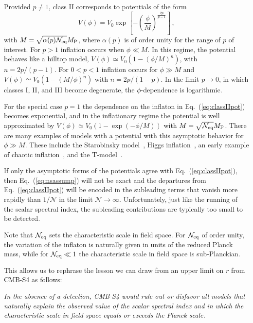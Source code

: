 Provided $p\neq 1$, class II corresponds to potentials of the form 
\begin{equation}\label{eq:classIIpot}
V(\phi)=V_0\exp\left[-\left(\frac{\phi}{M}\right)^{\frac{2p}{p-1}}\right]\,,
\end{equation}
with $M=\sqrt{\alpha(p)\mathcal{N}_{\rm eq}}M_{\rm P}$, where $\alpha(p)$ is of order unity for the range of $p$ of interest. For $p>1$ inflation occurs when $\phi\ll M$. In this regime, the potential behaves like a hilltop model, $V(\phi)\simeq V_0(1-\left(\phi/M\right)^n)$, with $n=2p/(p-1)$. For $0<p<1$ inflation occurs for $\phi\gg M$ and $V(\phi)\simeq V_0(1-\left(M/\phi\right)^n)$ with $n=2p/(1-p)$. In the limit $p\to0$, in which classes I, II, and III become degenerate, the $\phi$-dependence is logarithmic. 

For the special case $p=1$ the dependence on the inflaton in Eq.~(\ref{eq:classIIpot}) becomes exponential, and in the inflationary regime the potential is well approximated by $V(\phi)\simeq V_0\left(1-\exp\left(-\phi/M\right)\right)$ with $M=\sqrt{\mathcal{N}_{\rm eq}}M_{\rm P}$. There are many examples of models with a potential with this asymptotic behavior for $\phi\gg M$. These include the Starobinsky model~\cite{Starobinsky:1980te}, Higgs inflation~\cite{Salopek:1988qh,Bezrukov:2007ep}, an early example of chaotic inflation~\cite{Goncharov:1983mw}, and the T-model~\cite{Kallosh:2013hoa}.

If only the asymptotic forms of the potentials agree with Eq.~(\ref{eq:classIIpot}), then Eq.~(\ref{eq:nsassump}) will not be exact and the departures from Eq.~(\ref{eq:classIIpot}) will be encoded in the subleading terms that vanish more rapidly than $1/\mathcal{N}$ in the limit $\mathcal{N}\to\infty$. Unfortunately, just like the running of the scalar spectral index, the subleading contributions are typically too small to be detected.

Note that $\mathcal{N}_{\rm eq}$ sets the characteristic scale in field space. For $\mathcal{N}_{\rm eq}$ of order unity, the variation of the inflaton is naturally given in units of the reduced Planck mass, while for $\mathcal{N}_{\rm eq}\ll 1$ the characteristic scale in field space is sub-Planckian. 

This allows us to rephrase the lesson we can draw from an upper limit on $r$ from CMB-S4 as follows:

{\em In the absence of a detection, CMB-S4 would rule out or disfavor all models that naturally explain the observed value of the scalar spectral index and in which the characteristic scale in field space equals or exceeds the Planck scale.}


